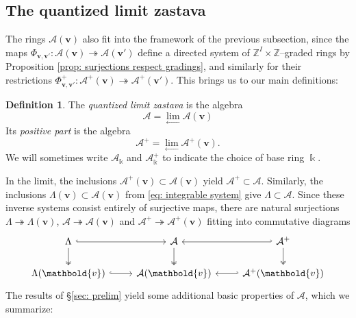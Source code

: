 \documentclass[11pt,reqno]{amsart}
\renewcommand{\mathbf}{\mathbold}
\numberwithin{equation}{section}
\theoremstyle{definition}
\newtheorem{Definition}[equation]{Definition}
\newcommand{\cA}{\mathcal{A}}
\newcommand{\bv}{\mathbf{v}}
\newcommand{\ZZ}{\mathbb{Z}}
\newcommand{\kk}{\Bbbk}
\renewcommand{\bv}{\mathbf{v}} %
\newcommand{\vertexset}{I}
\newcommand{\GT}{\Lambda}
\newcommand{\qzast}{\cA}
\newcommand{\qzastplus}{\cA^{+}}
\begin{document}
\subsection{The quantized limit zastava}

The rings $\qzast(\bv)$ also fit into the framework of the previous subsection, since the maps $\Phi_{\bv, \bv'}: \qzast(\bv) \twoheadrightarrow \qzast(\bv')$ define a directed system of $\ZZ^\vertexset \times \ZZ$--graded rings by Proposition \ref{prop: surjections respect gradings}, and similarly for their restrictions $\Phi_{\bv, \bv'}^+: \qzastplus(\bv) \twoheadrightarrow \qzastplus(\bv')$.
This brings us to our main definitions:
\begin{Definition}
    The \emph{quantized limit zastava} is the algebra
    $$
    \qzast = \lim_{\longleftarrow} \qzast(\bv)
    $$
    Its \emph{positive part} is the algebra
    $$
    \qzastplus = \lim_{\longleftarrow} \qzastplus(\bv).
    $$
    We will sometimes write $\qzast_\kk$ and $\qzastplus_\kk$ to indicate the choice of base ring $\kk$.
\end{Definition}



In the limit, the inclusions $\qzastplus(\bv) \subset \qzast(\bv)$ yield $\qzastplus \subset \qzast$.  Similarly,  the inclusions $\GT(\bv) \subset \qzast(\bv)$ from \eqref{eq: integrable system} give $\GT \subset \qzast$.  Since these  inverse systems consist entirely of surjective maps, there are natural surjections $\GT \twoheadrightarrow \GT(\bv)$, $\qzast \twoheadrightarrow \qzast(\bv)$ and $\qzastplus \twoheadrightarrow \qzastplus(\bv)$ fitting into commutative diagrams
\begin{equation}
    \begin{tikzcd}
        \GT \ar[d,two heads] \ar[r,hook] & \qzast \ar[d,two heads]  & \qzastplus \ar[l,hook'] \ar[d, two heads] \\ \GT(\bv) \ar[r,hook] & \qzast(\bv) & \qzastplus(\bv) \ar[l, hook']
    \end{tikzcd}
\end{equation}
The results of \S \ref{sec: prelim} yield some additional basic properties of  $\qzast$, which we summarize:
\end{document}
